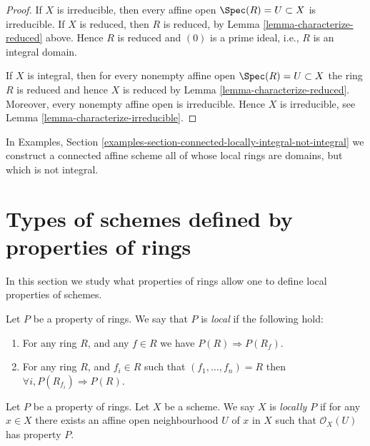 \begin{proof}
If $X$ is irreducible, then every affine open $\Spec(R) = U \subset X$
is irreducible. If $X$ is reduced, then $R$ is reduced, by
Lemma \ref{lemma-characterize-reduced} above. Hence $R$ is reduced
and $(0)$ is a prime ideal, i.e., $R$ is an integral domain.

\medskip\noindent
If $X$ is integral, then for every nonempty affine open
$\Spec(R) = U \subset X$ the ring $R$ is reduced
and hence $X$ is reduced by Lemma \ref{lemma-characterize-reduced}.
Moreover, every nonempty affine open is irreducible.
Hence $X$ is irreducible, see Lemma \ref{lemma-characterize-irreducible}.
\end{proof}

\noindent
In Examples, Section
\ref{examples-section-connected-locally-integral-not-integral}
we construct a connected affine scheme all of whose local rings are domains,
but which is not integral.











\section{Types of schemes defined by properties of rings}
\label{section-properties-rings}

\noindent
In this section we study what properties of rings
allow one to define local properties of schemes.

\begin{definition}
\label{definition-property-local}
Let $P$ be a property of rings.
We say that $P$ is {\it local} if the following hold:
\begin{enumerate}
\item For any ring $R$, and any $f \in R$ we have
$P(R) \Rightarrow P(R_f)$.
\item For any ring $R$, and $f_i \in R$ such that
$(f_1, \ldots, f_n) = R$ then
$\forall i, P(R_{f_i}) \Rightarrow P(R)$.
\end{enumerate}
\end{definition}

\begin{definition}
\label{definition-locally-P}
Let $P$ be a property of rings. Let $X$ be a scheme.
We say $X$ is {\it locally $P$} if for any $x \in X$
there exists an affine open neighbourhood $U$ of $x$
in $X$ such that $\mathcal{O}_X(U)$ has property $P$.
\end{definition}

